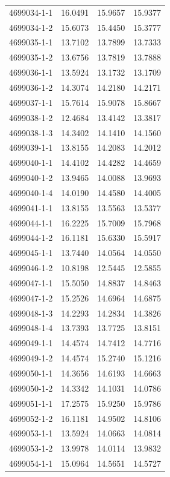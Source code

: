 \begin{longtable}{lrrr}
4699034-1-1 & 16.0491 & 15.9657 & 15.9377 \\
4699034-1-2 & 15.6073 & 15.4450 & 15.3777 \\
4699035-1-1 & 13.7102 & 13.7899 & 13.7333 \\
4699035-1-2 & 13.6756 & 13.7819 & 13.7888 \\
4699036-1-1 & 13.5924 & 13.1732 & 13.1709 \\
4699036-1-2 & 14.3074 & 14.2180 & 14.2171 \\
4699037-1-1 & 15.7614 & 15.9078 & 15.8667 \\
4699038-1-2 & 12.4684 & 13.4142 & 13.3817 \\
4699038-1-3 & 14.3402 & 14.1410 & 14.1560 \\
4699039-1-1 & 13.8155 & 14.2083 & 14.2012 \\
4699040-1-1 & 14.4102 & 14.4282 & 14.4659 \\
4699040-1-2 & 13.9465 & 14.0088 & 13.9693 \\
4699040-1-4 & 14.0190 & 14.4580 & 14.4005 \\
4699041-1-1 & 13.8155 & 13.5563 & 13.5377 \\
4699044-1-1 & 16.2225 & 15.7009 & 15.7968 \\
4699044-1-2 & 16.1181 & 15.6330 & 15.5917 \\
4699045-1-1 & 13.7440 & 14.0564 & 14.0550 \\
4699046-1-2 & 10.8198 & 12.5445 & 12.5855 \\
4699047-1-1 & 15.5050 & 14.8837 & 14.8463 \\
4699047-1-2 & 15.2526 & 14.6964 & 14.6875 \\
4699048-1-3 & 14.2293 & 14.2834 & 14.3826 \\
4699048-1-4 & 13.7393 & 13.7725 & 13.8151 \\
4699049-1-1 & 14.4574 & 14.7412 & 14.7716 \\
4699049-1-2 & 14.4574 & 15.2740 & 15.1216 \\
4699050-1-1 & 14.3656 & 14.6193 & 14.6663 \\
4699050-1-2 & 14.3342 & 14.1031 & 14.0786 \\
4699051-1-1 & 17.2575 & 15.9250 & 15.9786 \\
4699052-1-2 & 16.1181 & 14.9502 & 14.8106 \\
4699053-1-1 & 13.5924 & 14.0663 & 14.0814 \\
4699053-1-2 & 13.9978 & 14.0114 & 13.9832 \\
4699054-1-1 & 15.0964 & 14.5651 & 14.5727 \\

\end{longtable}
